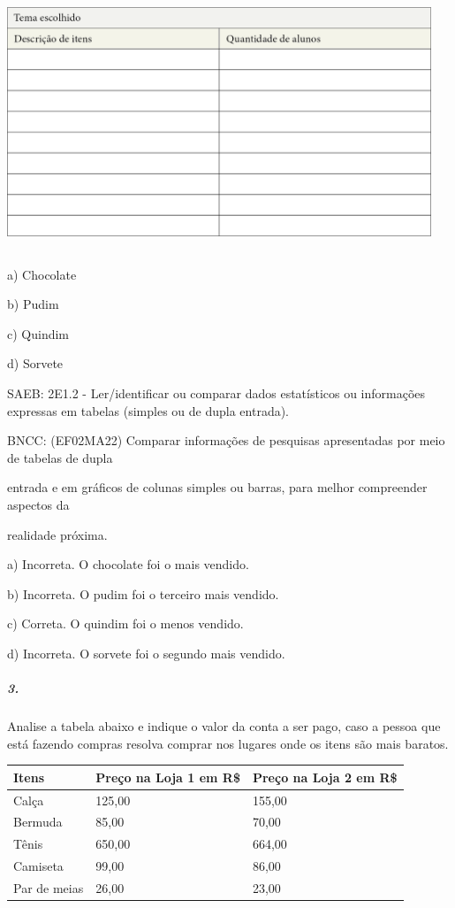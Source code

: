 \includegraphics[width=5.00000in,height=3.01042in]{media/image98.png}

a) Chocolate

b) Pudim

c) Quindim

d) Sorvete

SAEB: 2E1.2 - Ler/identificar ou comparar dados estatísticos ou
informações expressas em tabelas (simples ou de dupla entrada).

BNCC: (EF02MA22) Comparar informações de pesquisas apresentadas por meio
de tabelas de dupla

entrada e em gráficos de colunas simples ou barras, para melhor
compreender aspectos da

realidade próxima.

a) Incorreta. O chocolate foi o mais vendido.

b) Incorreta. O pudim foi o terceiro mais vendido.

c) Correta. O quindim foi o menos vendido.

d) Incorreta. O sorvete foi o segundo mais vendido.

\subparagraph{3.}\label{section-88}

Analise a tabela abaixo e indique o valor da conta a ser pago, caso a
pessoa que está fazendo compras resolva comprar nos lugares onde os
itens são mais baratos.

\begin{longtable}[]{@{}lll@{}}
\toprule
Itens & Preço na Loja 1 em R\$ & Preço na Loja 2 em R\$\tabularnewline
\midrule
\endhead
Calça & 125,00 & 155,00\tabularnewline
Bermuda & 85,00 & 70,00\tabularnewline
Tênis & 650,00 & 664,00\tabularnewline
Camiseta & 99,00 & 86,00\tabularnewline
Par de meias & 26,00 & 23,00\tabularnewline
\bottomrule
\end{longtable}

